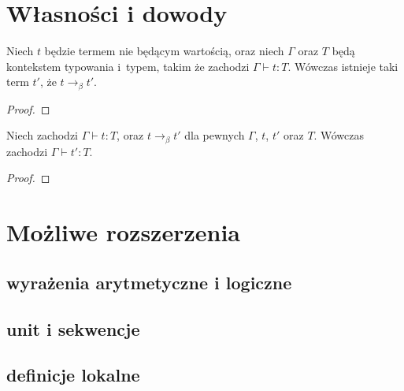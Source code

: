 \documentclass[11pt,leqno]{article}
\begin{document}
\section{Własności i dowody}
\setcounter{equation}{0}

\begin{twierdzenie}[Progres]
Niech $t$ będzie termem nie będącym wartością, oraz niech $\Gamma$ oraz $T$ będą
kontekstem typowania i~typem, takim że zachodzi $\Gamma\vdash t : T$. Wówczas istnieje
taki term $t'$, że $t \longrightarrow_\beta t'$.
\end{twierdzenie}
\begin{proof}
\end{proof}

\begin{twierdzenie}
Niech zachodzi $\Gamma \vdash t:T$, oraz $t \longrightarrow_\beta t'$ dla pewnych
$\Gamma$, $t$, $t'$ oraz $T$. Wówczas zachodzi
$\Gamma\vdash t' : T$.
\end{twierdzenie}
\begin{proof}
\end{proof}
	
\section{Możliwe rozszerzenia}                                 
\setcounter{equation}{0}


\subsection{wyrażenia arytmetyczne i logiczne}
\subsection{unit i sekwencje}
\subsection{definicje lokalne}
\end{document}

